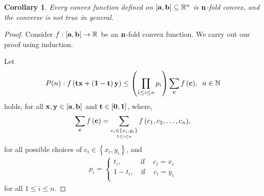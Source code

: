 \documentclass{amsart}
\theoremstyle{plain}
\newtheorem{corollary}{Corollary}
\numberwithin{equation}{section}
\begin{document}
\begin{corollary}
Every  convex function defined on $\left[ {{\bf{a}},{\bf{b}}}
\right]\subseteq\mathbb{R}^n$ is ${\bf{n}}$-fold convex, and the
converse is not true in general.
\end{corollary}
\begin{proof}
Consider $f:\left[ {{\bf{a}},{\bf{b}}} \right] \to \mathbb{R}$ be
an ${\bf{n}}$-fold convex function. We carry out our proof using
induction.

Let
\begin{align}
P(n): f\left( {{\bf{t}} {\bf{x}}+ \left( {{\bf{1}} - {\bf{t}}}
\right){\bf{y}}} \right) \le \left( {\prod\limits_{1 \le i \le n}
{p_i } } \right)\sum\limits_{\bf{c}} {f\left( {\bf{c}}
\right)},\,\,\, n \in \mathbb{N}
\end{align}
holds, for all ${\bf{x}}, {\bf{y}} \in  \left[ {{\bf{a}},{\bf{b}}}
\right]$ and ${\bf{t}} \in  \left[ {{\bf{0}},{\bf{1}}} \right]$,
where,
\begin{align*}
\sum\limits_{\bf{c}} {f\left( {\bf{c}} \right)}=
\sum\limits_{\mathop {c_{i}   \in \left\{ {x_{i} ,y_{i} }
\right\}}\limits_{1 \le i\le n} } {f\left( {c_1 ,c_2 , \ldots ,c_n
} \right)},
\end{align*}
for all possible choices of $c_{i}  \in \left\{ {x_{i} ,y_{i}
}\right\}$, and
\begin{align*}
p_i  = \left\{ \begin{array}{l}
 t_i ,\,\,\,\,\,\,\,\,\,\,\,\,\,\,\,\,\text{if}\,\,\,\,\,\,\,c_i  = x_i  \\
 1 - t_i ,\,\,\,\,\,\,\text{if}\,\,\,\,\,\,\,c_i  = y_i  \\
 \end{array} \right.
\end{align*}
for all $1\le i \le n$.


\end{proof}
\end{document}
